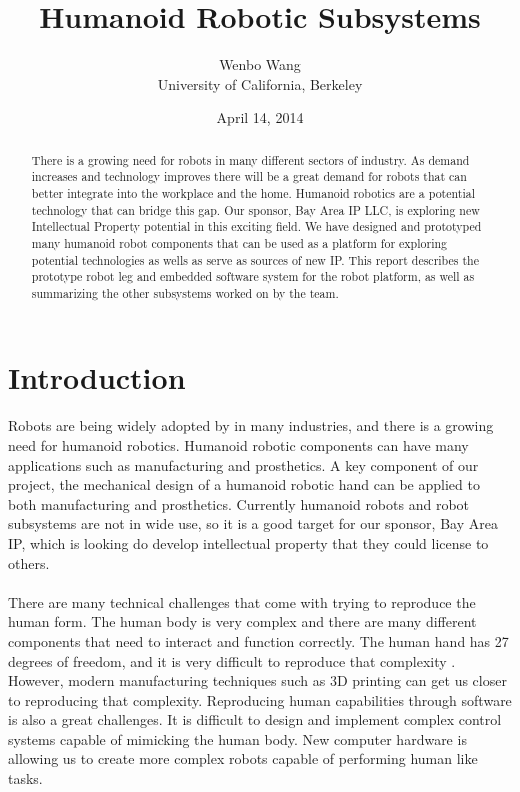 \documentclass[letterpaper,12pt]{article}
\title{Humanoid Robotic Subsystems}
\date{April 14, 2014}
\author{Wenbo Wang \\University of California, Berkeley}
\begin{document}
\maketitle

\begin{abstract}
There is a growing need for robots in many different sectors of industry. As
demand increases and technology improves there will be a great demand for robots
that can better integrate into the workplace and the home. Humanoid robotics are
a potential technology that can bridge this gap. Our sponsor, Bay Area IP LLC,
is exploring new Intellectual Property potential in this exciting field. We have
designed and prototyped many humanoid robot components that can be used as a
platform for exploring potential technologies as wells as serve as sources of
new IP. This report describes the prototype robot leg and embedded software
system for the robot platform, as well as summarizing the other subsystems
worked on by the team.
\end{abstract}

\section{Introduction}
\paragraph{}Robots are being widely adopted by in many industries, and there is
a growing need for humanoid robotics. Humanoid robotic components can have many
applications such as manufacturing and prosthetics. A key component of our
project, the mechanical design of a humanoid robotic hand can be applied to both
manufacturing and prosthetics. Currently humanoid robots and robot subsystems
are not in wide use, so it is a good target for our sponsor, Bay Area IP, which
is looking do develop intellectual property that they could license to others.

\paragraph{}There are many technical challenges that come with trying to
reproduce the human form. The human body is very complex and there are many
different components that need to interact and function correctly. The human
hand has 27 degrees of freedom, and it is very difficult to reproduce that
complexity \cite{ElKoura2003}. However, modern manufacturing techniques such as
3D printing can get us closer to reproducing that complexity. Reproducing human
capabilities through software is also a great challenges. It is difficult to
design and implement complex control systems capable of mimicking the human
body. New computer hardware is allowing us to create more complex robots capable
of performing human like tasks.
\end{document}
